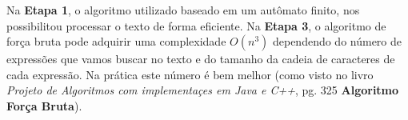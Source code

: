 \documentclass[12pt]{article}
\begin{document}
Na \textbf{Etapa 1}, o algoritmo utilizado baseado em um autômato finito, nos possibilitou processar o texto de forma eficiente. Na  \textbf{Etapa 3}, o algoritmo de força bruta pode adquirir uma complexidade $O(n^{3})$ dependendo do número de expressões que vamos buscar no texto e do tamanho da cadeia de caracteres de cada expressão. Na prática este número é bem melhor (como visto no livro \textit{Projeto de Algoritmos com implementaçes em Java e C++}, pg. 325 \textbf{Algoritmo Força Bruta}).
\end{document}
